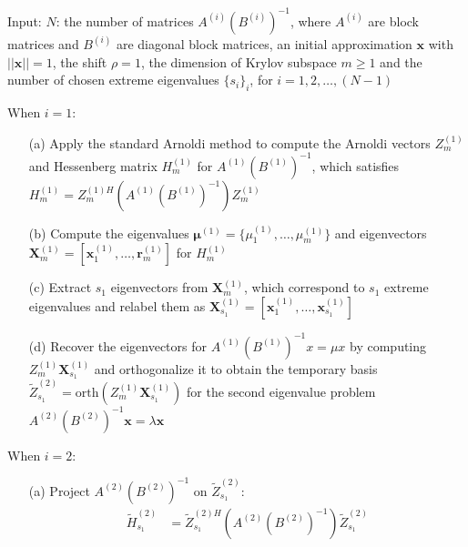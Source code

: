 \begin{algorithm}[H]
    \SetAlgoLined
    Input: $N$: the number of matrices $A^{(i)}\left(B^{(i)}\right)^{-1}$, where $A^{(i)}$ are block matrices and $B^{(i)}$ are diagonal block matrices, an initial approximation $\boldsymbol{x}$ with $||\boldsymbol{x}|| = 1$, the shift $\rho = 1$, the dimension of Krylov subspace $m\geq 1$ and the number of chosen extreme eigenvalues $\{s_{i}\}_{i}$, for $i = 1, 2, \dots, (N-1)$\\
    \vspace{0.5cm}
    \begin{algorithmic}[1]
        \STATE When $i = 1$:
        \begin{itemize}
            
            \item[(a)]Apply the standard Arnoldi method to compute the Arnoldi vectors $Z_{m}^{(1)}$ and Hessenberg matrix $H_{m}^{(1)}$ for $A^{(1)}\left(B^{(1)}\right)^{-1}$, which satisfies $H_{m}^{(1)} = Z_{m}^{(1)H}\left(A^{(1)}\left(B^{(1)}\right)^{-1}\right)Z_{m}^{(1)}$
    
            \item[(b)] Compute the eigenvalues $\boldsymbol{\mu}^{(1)} = \{\mu_{1}^{(1)}, \dots, \mu_{m}^{(1)}\}$ and eigenvectors $\boldsymbol{X}_{m}^{(1)} = \left[\boldsymbol{x}_{1}^{(1)}, \dots, \boldsymbol{r}_{m}^{(1)}\right]$ for $H_{m}^{(1)}$
            
            \item[(c)] Extract $s_{1}$ eigenvectors from $\boldsymbol{X}_{m}^{(1)}$, which correspond to $s_{1}$ extreme eigenvalues and relabel them as $\boldsymbol{X}_{s_{1}}^{(1)} = \left[\boldsymbol{x}_{1}^{(1)}, \dots, \boldsymbol{x}_{s_{1}}^{(1)}\right]$
            
            \item[(d)] Recover the eigenvectors for $A^{(1)}\left(B^{(1)}\right)^{-1}x = \mu x$ by computing $Z_{m}^{(1)}\boldsymbol{X}_{s_{1}}^{(1)}$ and orthogonalize it to obtain the temporary basis $\tilde{Z}_{s_{1}}^{(2)} = \text{orth}\left(Z_{m}^{(1)}\boldsymbol{X}_{s_{1}}^{(1)}\right)$ for the second eigenvalue problem $A^{(2)}\left(B^{(2)}\right)^{-1}\boldsymbol{x} = \lambda \boldsymbol{x}$
        \end{itemize}
        
        \STATE When $i = 2$:
        \begin{itemize}
            \item[(a)] Project $A^{(2)}\left(B^{(2)}\right)^{-1}$ on $\tilde{Z}_{s_{1}}^{(2)}$: 
            \begin{align*}
                \tilde{H}_{s_{1}}^{(2)} &= \tilde{Z}_{s_{1}}^{(2)H}\left(A^{(2)}\left(B^{(2)}\right)^{-1}\right) \tilde{Z}_{s_{1}}^{(2)}
            \end{align*}
            

\end{itemize}
\end{algorithmic}
\end{algorithm}
